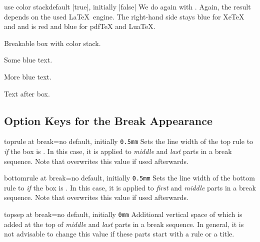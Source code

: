 \begin{docTcbKey}[][doc new=2020-10-09]{use color stack}{}{default |true|, initially |false|}
We do again with . Again, the result depends on
the used \LaTeX\ engine. The right-hand side stays blue for Xe\TeX{} and
and is red and blue for pdf\TeX{} and Lua\TeX{}.

\begin{dispExample}
\begin{multicols}{2}\footnotesize
Breakable box with color stack.
\begin{tcolorbox}[enhanced jigsaw, use color stack,
  size=small, colframe=gray, colback=yellow!10!white, colupper=blue,
  enforce breakable,%
  vfill before first, pad at break=1mm, break at=33mm ]
    Some blue text.\par\smallskip
    {\color{red}\itshape\lipsum[2]}\par\smallskip
    More blue text.
\end{tcolorbox}
Text after box.
\end{multicols}
\end{dispExample}

\end{docTcbKey}




\clearpage
\subsection{Option Keys for the Break Appearance}

\begin{docTcbKey}{toprule at break}{=}{no default, initially \texttt{0.5mm}}
  Sets the line width of the top rule to  \emph{if} the box is .
  In this case, it is applied to \emph{middle} and \emph{last} parts in a
  break sequence. Note that  overwrites this value
  if used afterwards.
\end{docTcbKey}


\begin{docTcbKey}{bottomrule at break}{=}{no default, initially \texttt{0.5mm}}
  Sets the line width of the bottom rule to  \emph{if} the box is .
  In this case, it is applied to \emph{first} and \emph{middle} parts in a
  break sequence. Note that  overwrites this value
  if used afterwards.
\end{docTcbKey}


\begin{docTcbKey}{topsep at break}{=}{no default, initially \texttt{0mm}}
  Additional vertical space of  which is added at the top of
  \emph{middle} and \emph{last} parts in a break sequence. In general,
  it is not advisable to change this value if these parts start with a rule or a title.
\end{docTcbKey}

